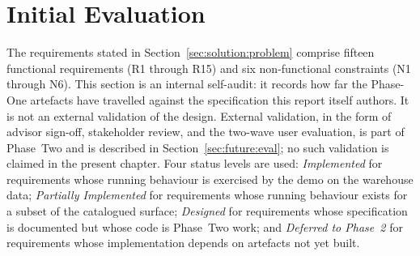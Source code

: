 \section{Initial Evaluation}
\label{sec:impl:eval}

The requirements stated in Section~\ref{sec:solution:problem} comprise
fifteen functional requirements (R1 through R15) and six
non-functional constraints (N1 through N6). This section is an
internal self-audit: it records how far the Phase-One artefacts have
travelled against the specification this report itself authors. It is
not an external validation of the design. External validation, in the
form of advisor sign-off, stakeholder review, and the two-wave user
evaluation, is part of Phase~Two and is described in
Section~\ref{sec:future:eval}; no such validation is claimed in the
present chapter. Four status levels are used:
\textit{Implemented} for requirements whose running behaviour is
exercised by the demo on the warehouse data;
\textit{Partially Implemented} for requirements whose running behaviour
exists for a subset of the catalogued surface;
\textit{Designed} for requirements whose specification is documented
but whose code is Phase~Two work; and
\textit{Deferred to Phase~2} for requirements whose implementation
depends on artefacts not yet built.

